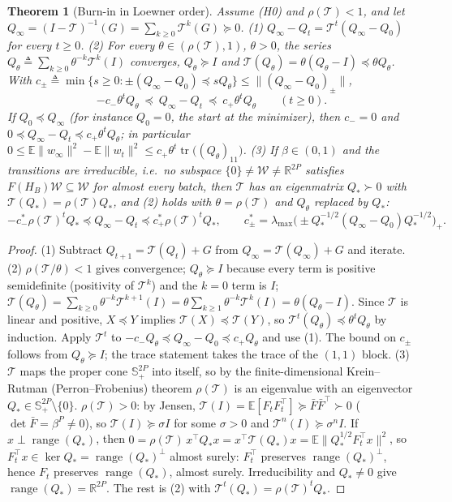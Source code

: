 \documentclass[11pt]{article}
\newtheorem{theorem}{Theorem}
\theoremstyle{remark}
\newcommand{\E}{\mathbb{E}}
\newcommand{\R}{\mathbb{R}}
\newcommand{\tr}{\operatorname{tr}}
\begin{document}
\begin{theorem}[Burn-in in Loewner order]\label{thm:burnin}
Assume (H0) and $\rho(\mathcal T)<1$, and let $Q_\infty=(I-\mathcal T)^{-1}(G)=\sum_{k\ge0}\mathcal T^k(G)\succeq0$.
(1) $Q_\infty-Q_t=\mathcal T^t(Q_\infty-Q_0)$ for every $t\ge0$.
(2) For every $\theta\in(\rho(\mathcal T),1)$, $\theta>0$, the series $Q_\theta\triangleq\sum_{k\ge0}\theta^{-k}\mathcal T^k(I)$ converges, $Q_\theta\succeq I$ and $\mathcal T(Q_\theta)=\theta(Q_\theta-I)\preceq\theta Q_\theta$. With $c_\pm\triangleq\min\{s\ge0:\pm(Q_\infty-Q_0)\preceq sQ_\theta\}\le\|(Q_\infty-Q_0)_\pm\|$,
\[
-c_-\theta^tQ_\theta\ \preceq\ Q_\infty-Q_t\ \preceq\ c_+\theta^tQ_\theta\qquad(t\ge0).
\]
If $Q_0\preceq Q_\infty$ (for instance $Q_0=0$, the start at the minimizer), then $c_-=0$ and $0\preceq Q_\infty-Q_t\preceq c_+\theta^tQ_\theta$; in particular $0\le\E\|w_\infty\|^2-\E\|w_t\|^2\le c_+\theta^t\tr\big((Q_\theta)_{11}\big)$.
(3) If $\beta\in(0,1)$ and the transitions are irreducible, i.e.\ no subspace $\{0\}\ne\mathcal W\ne\R^{2P}$ satisfies $F(H_{B})\mathcal W\subseteq\mathcal W$ for almost every batch, then $\mathcal T$ has an eigenmatrix $Q_*\succ0$ with $\mathcal T(Q_*)=\rho(\mathcal T)Q_*$, and (2) holds with $\theta=\rho(\mathcal T)$ and $Q_\theta$ replaced by $Q_*$:
\[
-c_-^*\rho(\mathcal T)^tQ_*\preceq Q_\infty-Q_t\preceq c_+^*\rho(\mathcal T)^tQ_*,\qquad c_\pm^*=\lambda_{\max}\big(\pm Q_*^{-1/2}(Q_\infty-Q_0)Q_*^{-1/2}\big)_+ .
\]
\end{theorem}
\begin{proof}
(1) Subtract $Q_{t+1}=\mathcal T(Q_t)+G$ from $Q_\infty=\mathcal T(Q_\infty)+G$ and iterate. (2) $\rho(\mathcal T/\theta)<1$ gives convergence; $Q_\theta\succeq I$ because every term is positive semidefinite (positivity of $\mathcal T^k$) and the $k=0$ term is $I$; $\mathcal T(Q_\theta)=\sum_{k\ge0}\theta^{-k}\mathcal T^{k+1}(I)=\theta\sum_{k\ge1}\theta^{-k}\mathcal T^k(I)=\theta(Q_\theta-I)$. Since $\mathcal T$ is linear and positive, $X\preceq Y$ implies $\mathcal T(X)\preceq\mathcal T(Y)$, so $\mathcal T^t(Q_\theta)\preceq\theta^tQ_\theta$ by induction. Apply $\mathcal T^t$ to $-c_-Q_\theta\preceq Q_\infty-Q_0\preceq c_+Q_\theta$ and use (1). The bound on $c_\pm$ follows from $Q_\theta\succeq I$; the trace statement takes the trace of the $(1,1)$ block. (3) $\mathcal T$ maps the proper cone $\mathbb S^{2P}_+$ into itself, so by the finite-dimensional Krein--Rutman (Perron--Frobenius) theorem \citep[Thm.~1.3.2]{berman1994} $\rho(\mathcal T)$ is an eigenvalue with an eigenvector $Q_*\in\mathbb S^{2P}_+\setminus\{0\}$. $\rho(\mathcal T)>0$: by Jensen, $\mathcal T(I)=\E[F_tF_t^\top]\succeq\bar F\bar F^\top\succ0$ ($\det\bar F=\beta^P\ne0$), so $\mathcal T(I)\succeq\sigma I$ for some $\sigma>0$ and $\mathcal T^n(I)\succeq\sigma^nI$. If $x\perp\operatorname{range}(Q_*)$, then $0=\rho(\mathcal T)\,x^\top Q_*x=x^\top\mathcal T(Q_*)x=\E\|Q_*^{1/2}F_t^\top x\|^2$, so $F_t^\top x\in\ker Q_*=\operatorname{range}(Q_*)^\perp$ almost surely: $F_t^\top$ preserves $\operatorname{range}(Q_*)^\perp$, hence $F_t$ preserves $\operatorname{range}(Q_*)$, almost surely. Irreducibility and $Q_*\ne0$ give $\operatorname{range}(Q_*)=\R^{2P}$. The rest is (2) with $\mathcal T^t(Q_*)=\rho(\mathcal T)^tQ_*$.
\end{proof}
\end{document}
